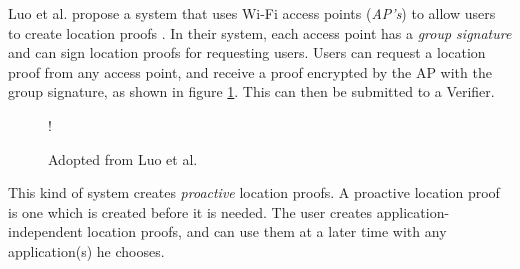 Luo et al. propose a system that uses Wi-Fi access points (\textit{AP's}) to allow users to create location proofs \cite{luo}. In their system, each access point has a \textit{group signature} and can sign location proofs for requesting users. Users can request a location proof from any access point, and receive a proof encrypted by the AP with the group signature, as shown in figure \ref{fig:luo_transaction}. This can then be submitted to a Verifier.

\begin{figure}[H]
\begin{center}
\resizebox {0.6\columnwidth} {!} {}
\end{center}
\caption{Adopted from Luo et al. \cite{luo}}
\label{fig:luo_transaction}
\end{figure}

This kind of system creates \textit{proactive} location proofs. A proactive location proof is one which is created before it is needed. The user creates application-independent location proofs, and can use them at a later time with any application(s) he chooses.